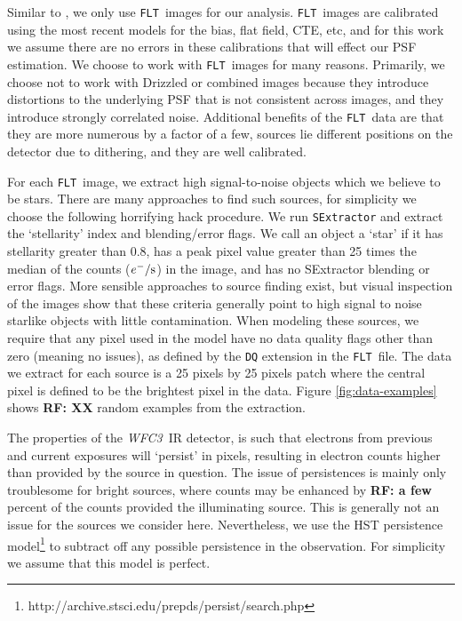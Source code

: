 \documentclass[12pt,letterpaper,preprint]{aastex}
\newcommand{\instrument}[1]{\textsl{#1}}
\newcommand{\rf}[1]{\textbf{RF: #1}}
\newcommand{\WFC}{\instrument{WFC3}}
\newcommand{\FLT}{\texttt{FLT}}
\begin{document}
Similar to \citet{anderson06}, we only use \FLT\ images for our analysis.  \FLT\ images are calibrated 
using the most recent models for the bias, flat field, CTE, etc, and for this work we assume there are 
no errors in these calibrations that will effect our PSF estimation.  We choose to work with \FLT\
images for many reasons.  Primarily, we choose not to work with Drizzled or combined images
because they introduce distortions to the underlying PSF that is not consistent across images, and 
they introduce strongly correlated noise.  Additional benefits of the \FLT\ data are that they are 
more numerous by a factor of a few, sources lie different positions on the detector due to dithering, 
and they are well calibrated.  

For each \FLT\ image, we extract high signal-to-noise objects which we believe to be stars.  There 
are many approaches to find such sources, for simplicity we choose the following horrifying hack 
procedure.  We run \texttt{SExtractor} \citep{bertin} and extract the `stellarity' index and blending/error 
flags.  We call an object a `star' if it has stellarity greater than 0.8, has a peak pixel value greater than 25
times the median of the counts ($e^- / \rm{s}$) in the image, and has no SExtractor blending or 
error flags.  More sensible approaches to source finding exist, but visual inspection of the images 
show that these criteria generally point to high signal to noise starlike objects with little contamination.
When modeling these sources, we require that any pixel used in the model have no data quality 
flags other than zero (meaning no issues), as defined by the \texttt{DQ} extension in the \FLT\ file.  
The data we extract for each source is a 25 pixels by 25 pixels patch where the central pixel is defined
to be the brightest pixel in the data.  Figure \ref{fig:data-examples} shows \rf{XX} random examples from the 
extraction.

The properties of the \WFC\ IR detector, is such that electrons from previous and current exposures 
will `persist' in pixels, resulting in electron counts higher than provided by the source in question.  
The issue of persistences is mainly only troublesome for bright sources, where counts may be 
enhanced by \rf{a few} percent of the counts provided the illuminating source.  This is generally 
not an issue for the sources we consider here.  Nevertheless, we use the HST persistence 
model\footnote{http://archive.stsci.edu/prepds/persist/search.php} to subtract off any possible 
persistence in the observation.  For simplicity we assume that this model is perfect.
\end{document}
